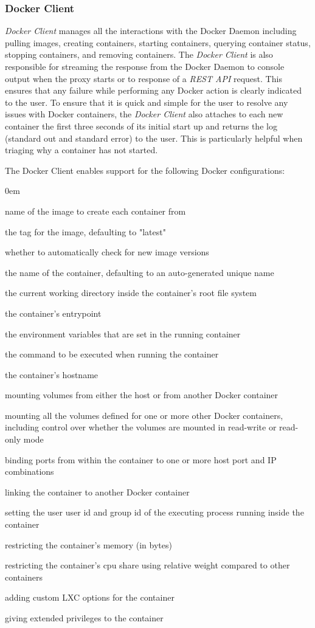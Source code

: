 \documentclass[a4paper,11pt,twoside]{report}
\begin{document}
\subsubsection*{Docker Client}
\textit{Docker Client} manages all the interactions with the Docker Daemon including pulling images, creating containers, starting containers, querying container status, stopping containers, and removing containers.  The \textit{Docker Client} is also responsible for streaming the response from the Docker Daemon to console output when the proxy starts or to response of a \textit{REST API} request.  This ensures that any failure while performing any Docker action is clearly indicated to the user.  To ensure that it is quick and simple for the user to resolve any issues with Docker containers, the \textit{Docker Client} also attaches to each new container the first three seconds of its initial start up and returns the log (standard out and standard error) to the user.  This is particularly helpful when triaging why a container has not started.

\noindent
The Docker Client enables support for the following Docker configurations:
	\begin{list}{-}{}
		\itemsep0em	
		\item name of the image to create each container from
		\item the tag for the image, defaulting to "latest"
		\item whether to automatically check for new image versions
		\item the name of the container, defaulting to an auto-generated unique name
		\item the current working directory inside the container's root file system
		\item the container's entrypoint
		\item the environment variables that are set in the running container
		\item the command to be executed when running the container
		\item the container's hostname
		\item mounting volumes from either the host or from another Docker container
		\item mounting all the volumes defined for one or more other Docker containers, including control over whether the volumes are mounted in read-write or read-only mode
		\item binding ports from within the container to one or more host port and IP combinations
		\item linking the container to another Docker container
		\item setting the user user id and group id of the executing process running inside the container
		\item restricting the container's memory (in bytes)
		\item restricting the container's cpu share using relative weight compared to other containers
		\item adding custom LXC options for the container
		\item giving extended privileges to the container
	\end{list}
	
\end{document}
